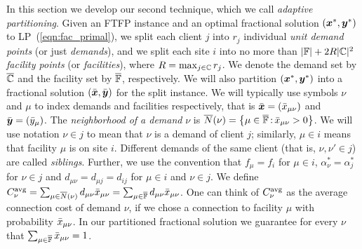 \documentclass{llncs}
\begin{document}
In this section we develop our second technique, which we call
\emph{adaptive partitioning}. Given an FTFP instance and an optimal
fractional solution $(\boldsymbol{x}^\ast, \boldsymbol{y}^\ast)$ to
LP~(\ref{eqn:fac_primal}), we split each client $j$ into $r_j$
individual \emph{unit demand points} (or just \emph{demands}), and we
split each site $i$ into no more than $|\mathbb{F}|+2R|\mathbb{C}|^2$
\emph{facility points} (or \emph{facilities}), where
$R=\max_{j\in\mathbb{C}}r_j$. We denote the demand set by $\overline{\mathbb{C}}$
and the facility set by $\overline{\mathbb{F}}$, respectively.  We will also
partition $(\boldsymbol{x}^\ast,\boldsymbol{y}^\ast)$ into a fractional solution
$(\bar{\boldsymbol{x}},\bar{\boldsymbol{y}})$ for the split instance.  We will typically use
symbols $\nu$ and $\mu$ to index demands and facilities respectively,
that is $\bar{\boldsymbol{x}} = ({\bar x}_{\mu\nu})$ and $\bar{\boldsymbol{y}} = ({\bar y}_{\mu})$.
The \emph{neighborhood of a demand} $\nu$ is
${\overline{N}}(\nu)={ \left\{ \mu\in\overline{\mathbb{F}} {\,:\,} {\bar x}_{\mu\nu}>0 \right\} }$.
We will use notation $\nu\in j$ to mean that $\nu$ is a demand of
client $j$; similarly, $\mu\in i$ means that facility $\mu$ is on site
$i$. Different demands of the same client (that is, $\nu,\nu'\in j$)
are called \emph{siblings}.  Further, we use the convention that
$f_\mu = f_i$ for $\mu\in i$, $\alpha_\nu^\ast = \alpha_j^\ast$ for
$\nu\in j$ and $d_{\mu\nu} = d_{\mu j} = d_{ij}$ for $\mu\in i$ and
$\nu\in j$.  We define $C^{{\mbox{\scriptsize\rm avg}}}_{\nu}
=\sum_{\mu\in{\overline{N}}(\nu)}d_{\mu\nu}{\bar x}_{\mu\nu} =
\sum_{\mu\in\overline{\mathbb{F}}}d_{\mu\nu}{\bar x}_{\mu\nu}$.  One can think of
$C^{{\mbox{\scriptsize\rm avg}}}_{\nu}$ as the average connection cost of demand $\nu$, if we
chose a connection to facility $\mu$ with probability
${\bar x}_{\mu\nu}$. In our partitioned fractional solution we guarantee
for every $\nu$ that $\sum_{\mu\in\overline{\mathbb{F}}} {\bar x}_{\mu\nu}=1$.
\end{document}
